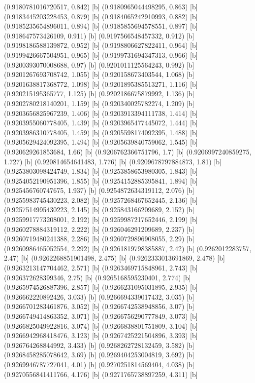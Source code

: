 {{{(0.9180781016720517, 0.842) [b] 
(0.9180965044498295, 0.863) [b] 
(0.9183445203228453, 0.879) [b] 
(0.9184065242910993, 0.882) [b] 
(0.9185235654896011, 0.894) [b] 
(0.9185855694578551, 0.897) [b] 
(0.918647573426109, 0.911) [b] 
(0.9197566548457332, 0.912) [b] 
(0.9198186588139872, 0.952) [b] 
(0.9198806627822411, 0.964) [b] 
(0.9199426667504951, 0.965) [b] 
(0.9199731694347313, 0.966) [b] 
(0.9200393070008688, 0.97) [b] 
(0.9201011125564243, 0.992) [b] 
(0.9201267693708742, 1.055) [b] 
(0.920158673403544, 1.068) [b] 
(0.9201638817368772, 1.098) [b] 
(0.9201895385513271, 1.116) [b] 
(0.920215195365777, 1.125) [b] 
(0.9202186675879992, 1.136) [b] 
(0.9202780218140201, 1.159) [b] 
(0.920340025782274, 1.209) [b] 
(0.9203656825967239, 1.406) [b] 
(0.9203913394111738, 1.414) [b] 
(0.9203955060778405, 1.439) [b] 
(0.9203965477445072, 1.444) [b] 
(0.9203986310778405, 1.459) [b] 
(0.9205598174092395, 1.488) [b] 
(0.9205629424092395, 1.494) [b] 
(0.9205639840759062, 1.545) [b] 
(0.920629261853684, 1.66) [b] 
(0.9206762366751796, 1.7) [b] 
(0.9206997240859275, 1.727) [b] 
(0.920814654641483, 1.776) [b] 
(0.9209678797884873, 1.81) [b] 
(0.9253803098424749, 1.834) [b] 
(0.9253858653980305, 1.843) [b] 
(0.9254052190951396, 1.855) [b] 
(0.9254152885395841, 1.894) [b] 
(0.925456760747675, 1.937) [b] 
(0.9254872634319112, 2.076) [b] 
(0.9255983745430223, 2.082) [b] 
(0.9257268467652445, 2.136) [b] 
(0.9257514995430223, 2.145) [b] 
(0.925843166209689, 2.152) [b] 
(0.9259917773208001, 2.192) [b] 
(0.9259987217652446, 2.199) [b] 
(0.9260278884319112, 2.222) [b] 
(0.926046291209689, 2.237) [b] 
(0.9260719480241388, 2.286) [b] 
(0.9260729896908055, 2.29) [b] 
(0.9260986465052554, 2.292) [b] 
(0.9261819798385887, 2.42) [b] 
(0.9262012283757, 2.47) [b] 
(0.9262268851901498, 2.475) [b] 
(0.9262333013691869, 2.478) [b] 
(0.9263213147704462, 2.571) [b] 
(0.9263469715848961, 2.743) [b] 
(0.926372628399346, 2.75) [b] 
(0.9265168595230401, 2.774) [b] 
(0.9265974526887396, 2.857) [b] 
(0.9266231095031895, 2.935) [b] 
(0.926662220892426, 3.033) [b] 
(0.9266694339017432, 3.035) [b] 
(0.9266701283461876, 3.052) [b] 
(0.9266742538948856, 3.07) [b] 
(0.9266749414863352, 3.071) [b] 
(0.9266756290777849, 3.073) [b] 
(0.9266825049922816, 3.074) [b] 
(0.9266838801751809, 3.104) [b] 
(0.9266942968418476, 3.123) [b] 
(0.9267425221504896, 3.393) [b] 
(0.926764268844992, 3.433) [b] 
(0.9268262728132459, 3.582) [b] 
(0.9268458285078642, 3.69) [b] 
(0.9269404253004819, 3.692) [b] 
(0.9269946787727041, 4.01) [b] 
(0.9270251814569404, 4.038) [b] 
(0.9270556841411766, 4.176) [b] 
(0.9271765738897259, 4.311) [b] 
}}}
